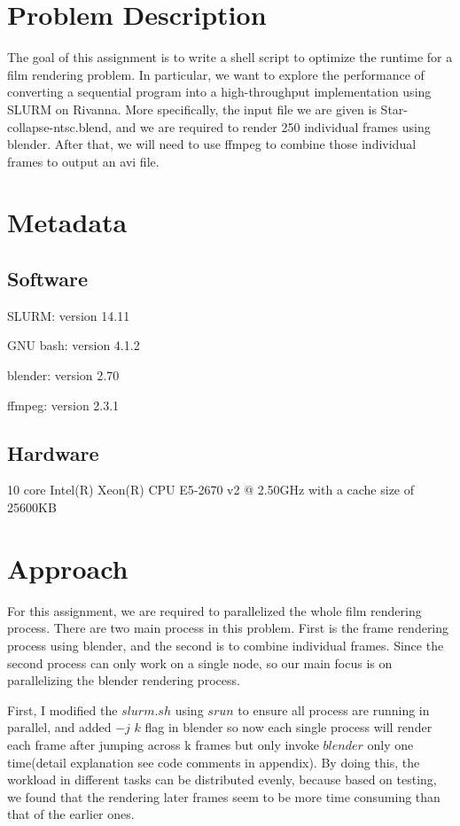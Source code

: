 \documentclass{cs4444}
\begin{document}
\maketitle

\section{Problem Description}
The goal of this assignment is to write a shell script to optimize the runtime for a film rendering problem. In particular, we want to explore the performance of converting a sequential program into a high-throughput implementation using SLURM on Rivanna.
	More specifically, the input file we are given is Star-collapse-ntsc.blend, and we are required to render 250 individual frames using blender. After that, we will need to use ffmpeg to combine those individual frames to output an avi file.  
\section{Metadata}
\subsection{Software}
	SLURM: version 14.11
	
	GNU bash: version 4.1.2
	
	blender: version 2.70
	
	ffmpeg: version 2.3.1

\subsection{Hardware}
	10 core Intel(R) Xeon(R) CPU E5-2670 v2 @ 2.50GHz with a cache size of 25600KB
	
\section{Approach}
	For this assignment, we are required to parallelized the whole film rendering process. There are two main process in this problem. First is the frame rendering process using blender, and the second is to combine individual frames. Since the second process can only work on a single node, so our main focus is on parallelizing the blender rendering process. 
	
	First, I modified the $slurm.sh$ using $srun$ to ensure all process are running in parallel, and added $-j$ $k$ flag in blender so now each single process will render each frame after jumping across k frames but only invoke $blender$ only one time(detail explanation see code comments in appendix). By doing this, the workload in different tasks can be distributed evenly, because based on testing, we found that the rendering later frames seem to be more time consuming than that of the earlier ones.
	
\end{document}
